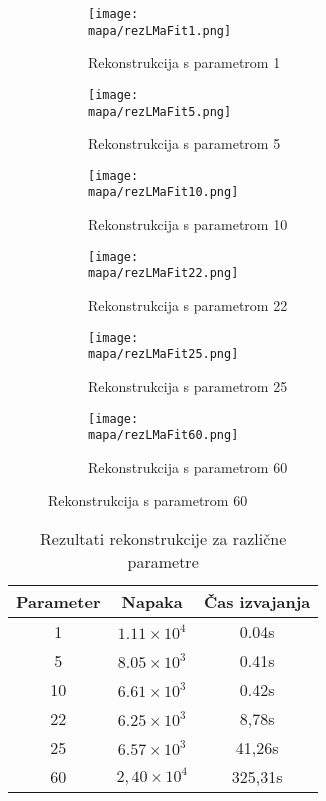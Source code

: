 \renewcommand{\mapa}{Poglavja/Slike/informacija ranga}

\begin{figure}[!ht]
    \begin{subfigure}{0.325\linewidth}
        \texttt{[image: \\mapa/rezLMaFit1.png]}
        \caption{Rekonstrukcija s parametrom 1}
    \end{subfigure}
    \hfill
    \begin{subfigure}{0.325\linewidth}
        \texttt{[image: \\mapa/rezLMaFit5.png]}
        \caption{Rekonstrukcija s parametrom 5}
    \end{subfigure}
    \hfill
    \begin{subfigure}{0.325\linewidth}
        \texttt{[image: \\mapa/rezLMaFit10.png]}
        \caption{Rekonstrukcija s parametrom 10}
    \end{subfigure}

    \begin{subfigure}{0.325\linewidth}
        \texttt{[image: \\mapa/rezLMaFit22.png]}
        \caption{Rekonstrukcija s parametrom 22}
    \end{subfigure}
    \hfill
    \begin{subfigure}{0.325\linewidth}
        \texttt{[image: \\mapa/rezLMaFit25.png]}
        \caption{Rekonstrukcija s parametrom 25}
    \end{subfigure}
    \hfill
    \begin{subfigure}{0.325\linewidth}
        \texttt{[image: \\mapa/rezLMaFit60.png]}
        \caption{Rekonstrukcija s parametrom 60}
    \end{subfigure}
\end{figure}

\begin{table}[h]
    \centering
    \begin{tabular}{|c|c|c|}
        \hline
        Parameter & Napaka & Čas izvajanja \\
        \hline
        1         & $1.11 \times 10^4$ & 0.04s        \\
        5         & $8.05 \times 10^3$ & 0.41s         \\
        10        & $6.61 \times 10^3$ & 0.42s        \\
        22        & $6.25 \times 10^3$ & 8,78s       \\
        25        & $6.57 \times 10^3$ & 41,26s        \\
        60        & $2,40 \times 10^4$ & 325,31s        \\
        \hline
    \end{tabular}
    \caption{Rezultati rekonstrukcije za različne parametre}
\end{table}
